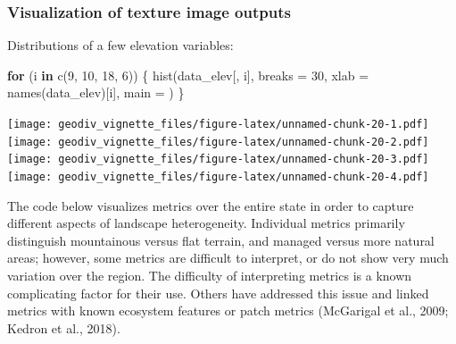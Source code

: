 \documentclass[
]{article}
\newenvironment{Shaded}{\begin{snugshade}}{\end{snugshade}}
\newcommand{\AttributeTok}[1]{\textcolor[rgb]{0.77,0.63,0.00}{#1}}
\newcommand{\ControlFlowTok}[1]{\textcolor[rgb]{0.13,0.29,0.53}{\textbf{#1}}}
\newcommand{\DecValTok}[1]{\textcolor[rgb]{0.00,0.00,0.81}{#1}}
\newcommand{\FunctionTok}[1]{\textcolor[rgb]{0.00,0.00,0.00}{#1}}
\newcommand{\NormalTok}[1]{#1}
\newcommand{\StringTok}[1]{\textcolor[rgb]{0.31,0.60,0.02}{#1}}
\begin{document}
\hypertarget{visualization-of-texture-image-outputs}{%
\subsubsection{Visualization of texture image
outputs}\label{visualization-of-texture-image-outputs}}

Distributions of a few elevation variables:

\begin{Shaded}
\begin{Highlighting}[]
\ControlFlowTok{for}\NormalTok{ (i }\ControlFlowTok{in} \FunctionTok{c}\NormalTok{(}\DecValTok{9}\NormalTok{, }\DecValTok{10}\NormalTok{, }\DecValTok{18}\NormalTok{, }\DecValTok{6}\NormalTok{)) \{}
  \FunctionTok{hist}\NormalTok{(data\_elev[, i], }\AttributeTok{breaks =} \DecValTok{30}\NormalTok{, }\AttributeTok{xlab =} \FunctionTok{names}\NormalTok{(data\_elev)[i], }\AttributeTok{main =} \StringTok{\textquotesingle{}\textquotesingle{}}\NormalTok{)}
\NormalTok{\}}
\end{Highlighting}
\end{Shaded}

\texttt{[image: geodiv\_vignette\_files/figure-latex/unnamed-chunk-20-1.pdf]}
\texttt{[image: geodiv\_vignette\_files/figure-latex/unnamed-chunk-20-2.pdf]}
\texttt{[image: geodiv\_vignette\_files/figure-latex/unnamed-chunk-20-3.pdf]}
\texttt{[image: geodiv\_vignette\_files/figure-latex/unnamed-chunk-20-4.pdf]}

The code below visualizes metrics over the entire state in order to
capture different aspects of landscape heterogeneity. Individual metrics
primarily distinguish mountainous versus flat terrain, and managed
versus more natural areas; however, some metrics are difficult to
interpret, or do not show very much variation over the region. The
difficulty of interpreting metrics is a known complicating factor for
their use. Others have addressed this issue and linked metrics with
known ecosystem features or patch metrics (McGarigal et al., 2009;
Kedron et al., 2018).
\end{document}
